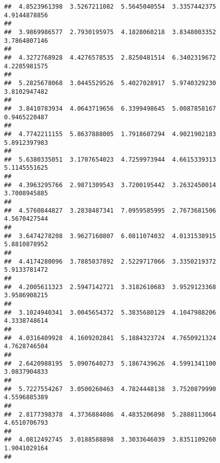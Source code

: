 \documentclass[]{article}
\begin{document}
\begin{verbatim}
##  4.8523961398  3.5267211082  5.5645040554  3.3357442375  4.9144878856 
##                                                                       
##  3.9869986577  2.7930195975  4.1828060218  3.8348003352  3.7864807146 
##                                                                       
##  4.3272768928  4.4276578535  2.8250481514  6.3402319672  4.2285981575 
##                                                                       
##  5.2825678068  3.0445529526  5.4027028917  5.9740329230  3.8102947482 
##                                                                       
##  3.8410783934  4.0643719656  6.3399498645  5.0087858167  0.9465220487 
##                                                                       
##  4.7742211155  5.8637888005  1.7918607294  4.9021902183  5.8912397983 
##                                                                       
##  5.6380335051  3.1707654023  4.7259973944  4.6615339313  5.1145551625 
##                                                                       
##  4.3963295766  2.9871309543  3.7200195442  3.2632450014  3.7008945885 
##                                                                       
##  4.5760844827  3.2838487341  7.0959585995  2.7673681506  4.5670427544 
##                                                                       
##  3.6474278208  3.9627160807  6.0811074032  4.0131538915  5.8810878952 
##                                                                       
##  4.4174280096  3.7885037892  2.5229717066  3.3350219372  5.9133781472 
##                                                                       
##  4.2005611323  2.5947142721  3.3182610683  3.9529123368  3.9586908215 
##                                                                       
##  3.1024940341  3.0045654372  5.3835680129  4.1047988206  4.3338748614 
##                                                                       
##  4.0316409928  4.1609202841  5.1884323724  4.7650921324  4.7628746504 
##                                                                       
##  2.6420988195  5.0907640273  5.1867439626  4.5991341100  3.0837904833 
##                                                                       
##  5.7227554267  3.0500260463  4.7824448138  3.7520879990  4.5596885389 
##                                                                       
##  2.8177398378  4.3736884086  4.4835206898  5.2888113064  4.6510706793 
##                                                                       
##  4.0812492745  3.0188588898  3.3033646039  3.8351109260  1.9041029164 
##                                                                       

\end{verbatim}
\end{document}

